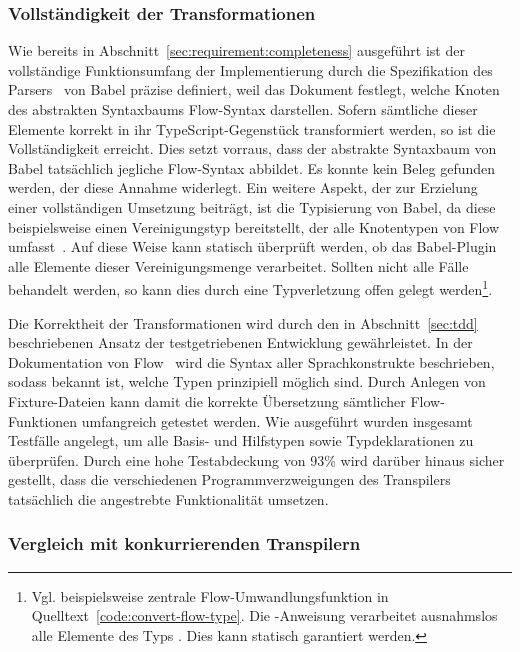 \subsubsection{Vollständigkeit der Transformationen}

Wie bereits in Abschnitt~\ref{sec:requirement:completeness} ausgeführt ist der vollständige Funktionsumfang der Implementierung durch die Spezifikation des Parsers~\autocite{BABEL:PARSER_SPEC} von Babel präzise definiert, weil das Dokument festlegt, welche Knoten des abstrakten Syntaxbaums Flow-Syntax darstellen. Sofern sämtliche dieser Elemente korrekt in ihr TypeScript-Gegenstück transformiert werden, so ist die Vollständigkeit erreicht. Dies setzt vorraus, dass der abstrakte Syntaxbaum von Babel tatsächlich jegliche Flow-Syntax abbildet. Es konnte kein Beleg gefunden werden, der diese Annahme widerlegt.
Ein weitere Aspekt, der zur Erzielung einer vollständigen Umsetzung beiträgt, ist die Typisierung von Babel, da diese beispielsweise einen Vereinigungstyp  bereitstellt, der alle Knotentypen von Flow umfasst~\autocite{BABEL:TYPES}. Auf diese Weise kann statisch überprüft werden, ob das Babel-Plugin alle Elemente dieser Vereinigungsmenge verarbeitet. Sollten nicht alle Fälle behandelt werden, so kann dies durch eine Typverletzung offen gelegt werden\footnote{Vgl. beispielsweise zentrale Flow-Umwandlungsfunktion in Quelltext~\ref{code:convert-flow-type}. Die -Anweisung verarbeitet ausnahmslos alle Elemente des Typs . Dies kann statisch garantiert werden.}.

Die Korrektheit der Transformationen wird durch den in Abschnitt~\ref{sec:tdd} beschriebenen Ansatz der testgetriebenen Entwicklung gewährleistet. In der Dokumentation von Flow~\autocite{FLOW:TYPE_ANNOTATIONS} wird die Syntax aller Sprachkonstrukte beschrieben, sodass bekannt ist, welche Typen prinzipiell möglich sind. Durch Anlegen von Fixture-Dateien kann damit die korrekte Übersetzung sämtlicher Flow-Funktionen umfangreich getestet werden. Wie ausgeführt wurden insgesamt \numberOfTests Testfälle angelegt, um alle Basis- und Hilfstypen sowie Typdeklarationen zu überprüfen. Durch eine hohe Testabdeckung von 93\% wird darüber hinaus sicher gestellt, dass die verschiedenen Programmverzweigungen des Transpilers tatsächlich die angestrebte Funktionalität umsetzen.


\subsubsection{Vergleich mit konkurrierenden Transpilern}

